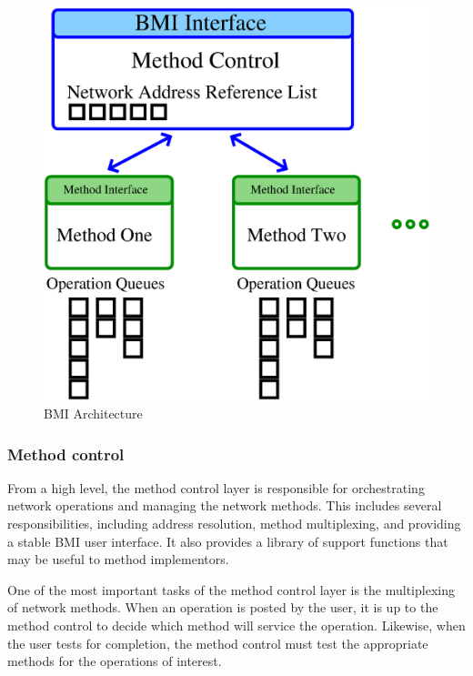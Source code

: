 \documentclass[11pt]{article}
\begin{document}
\begin{figure}
\begin{center}
\includegraphics[scale=0.4]{bmi-arch-color.eps}
\end{center}
\caption{BMI Architecture \label{fig:bmi-arch}}
\end{figure}

\subsubsection{Method control}
\label{method-control-intro}

From a high level, the method control layer is responsible for
orchestrating network operations and managing the network methods.
This includes several responsibilities, including address resolution,
method multiplexing, and providing a stable BMI user interface.  It also
provides a library of support functions that may be useful to method
implementors.

One of the most important tasks of the method control layer is the
multiplexing of network methods.  When an operation is
posted by the user, it is up to the method control to decide which
method will service the operation.  Likewise, when the user tests for
completion, the method control must test the appropriate methods for
the operations of interest.
\end{document}
